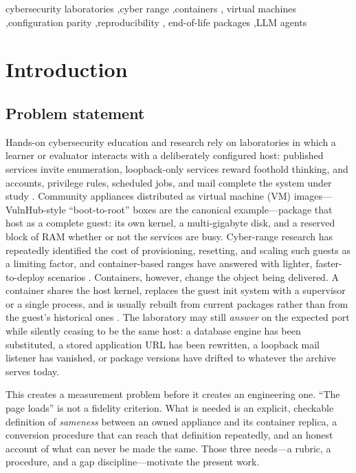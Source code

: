 \documentclass[3p,twocolumn,authoryear]{elsarticle}
\begin{document}
\begin{frontmatter}
\begin{keyword}
cybersecurity laboratories \sep cyber range \sep containers \sep
virtual machines \sep configuration parity \sep reproducibility \sep
end-of-life packages \sep LLM agents
\end{keyword}

\end{frontmatter}

\section{Introduction}
\label{sec:intro}

\subsection{Problem statement}

Hands-on cybersecurity education and research rely on laboratories in
which a learner or evaluator interacts with a deliberately configured
host: published services invite enumeration, loopback-only services
reward foothold thinking, and accounts, privilege rules, scheduled
jobs, and mail complete the system under study \citep{du2007,
thompson2018, yamin2020}. Community appliances distributed as virtual
machine (VM) images---VulnHub-style ``boot-to-root'' boxes are the
canonical example---package that host as a complete guest: its own
kernel, a multi-gigabyte disk, and a reserved block of RAM whether or
not the services are busy. Cyber-range research has repeatedly
identified the cost of provisioning, resetting, and scaling such
guests as a limiting factor, and container-based ranges have answered
with lighter, faster-to-deploy scenarios \citep{chouliaras2023,
nakata2021, ukwandu2020}. Containers, however, change the object being
delivered. A container shares the host kernel, replaces the guest init
system with a supervisor or a single process, and is usually rebuilt
from current packages rather than from the guest's historical ones
\citep{boettiger2015, sultan2019}. The laboratory may still \emph{answer}
on the expected port while silently ceasing to be the same host:
a database engine has been substituted, a stored application URL has
been rewritten, a loopback mail listener has vanished, or package
versions have drifted to whatever the archive serves today.

This creates a measurement problem before it creates an engineering
one. ``The page loads'' is not a fidelity criterion. What is needed is
an explicit, checkable definition of \emph{sameness} between an owned
appliance and its container replica, a conversion procedure that can
reach that definition repeatedly, and an honest account of what can
never be made the same. Those three needs---a rubric, a procedure, and
a gap discipline---motivate the present work.
\end{document}
